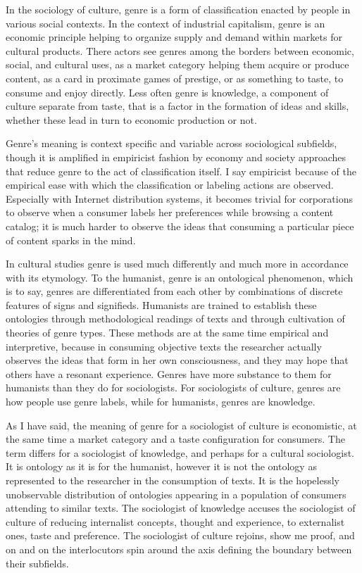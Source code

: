 \documentclass[]{book}
\theoremstyle{definition}
\theoremstyle{definition}
\theoremstyle{definition}
\theoremstyle{remark}
\begin{document}
In the sociology of culture, genre is a form of classification enacted
by people in various social contexts. In the context of industrial
capitalism, genre is an economic principle helping to organize supply
and demand within markets for cultural products. There actors see genres
among the borders between economic, social, and cultural uses, as a
market category helping them acquire or produce content, as a card in
proximate games of prestige, or as something to taste, to consume and
enjoy directly. Less often genre is knowledge, a component of culture
separate from taste, that is a factor in the formation of ideas and
skills, whether these lead in turn to economic production or not.

Genre's meaning is context specific and variable across sociological
subfields, though it is amplified in empiricist fashion by economy and
society approaches that reduce genre to the act of classification
itself. I say empiricist because of the empirical ease with which the
classification or labeling actions are observed. Especially with
Internet distribution systems, it becomes trivial for corporations to
observe when a consumer labels her preferences while browsing a content
catalog; it is much harder to observe the ideas that consuming a
particular piece of content sparks in the mind.

In cultural studies genre is used much differently and much more in
accordance with its etymology. To the humanist, genre is an ontological
phenomenon, which is to say, genres are differentiated from each other
by combinations of discrete features of signs and signifieds. Humanists
are trained to establish these ontologies through methodological
readings of texts and through cultivation of theories of genre types.
These methods are at the same time empirical and interpretive, because
in consuming objective texts the researcher actually observes the ideas
that form in her own consciousness, and they may hope that others have a
resonant experience. Genres have more substance to them for humanists
than they do for sociologists. For sociologists of culture, genres are
how people use genre labels, while for humanists, genres are knowledge.

As I have said, the meaning of genre for a sociologist of culture is
economistic, at the same time a market category and a taste
configuration for consumers. The term differs for a sociologist of
knowledge, and perhaps for a cultural sociologist. It is ontology as it
is for the humanist, however it is not the ontology as represented to
the researcher in the consumption of texts. It is the hopelessly
unobservable distribution of ontologies appearing in a population of
consumers attending to similar texts. The sociologist of knowledge
accuses the sociologist of culture of reducing internalist concepts,
thought and experience, to externalist ones, taste and preference. The
sociologist of culture rejoins, show me proof, and on and on the
interlocutors spin around the axis defining the boundary between their
subfields.
\end{document}
